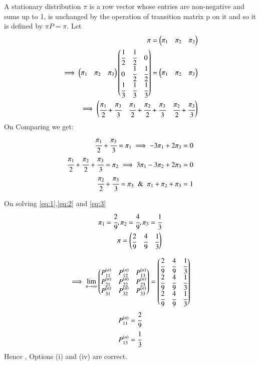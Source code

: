 \begin{enumerate}
A stationary distribution $\pi$ is a row vector whose entries are non-negative and sums up to 1, is unchanged by the operation of transition matrix p on it and so it is defined by $\pi P = \pi$.
Let
\begin{align}
    \pi=\begin{pmatrix}\pi_{1}&\pi_{2}&\pi_{3}\end{pmatrix}
\\
    \implies \begin{pmatrix}\pi_{1}&\pi_{2}&\pi_{3}\end{pmatrix}\begin{pmatrix}\cfrac{1}{2}&\cfrac{1}{2}&0\\0&\cfrac{1}{2}&\cfrac{1}{2}\\\cfrac{1}{3}&\cfrac{1}{3}&\cfrac{1}{3}\end{pmatrix} = \begin{pmatrix}\pi_{1}&\pi_{2}&\pi_{3}\end{pmatrix}
\\
    \implies \begin{pmatrix} \cfrac{\pi_{1}}{2}+\cfrac{\pi_{3}}{3}& \cfrac{\pi_{1}}{2}+\cfrac{\pi_{2}}{2}+\cfrac{\pi_{3}}{3}&\cfrac{\pi_{2}}{2}+\cfrac{\pi_{3}}{3}\end{pmatrix}
\end{align}
On Comparing we get:
\begin{align}
    \cfrac{\pi_{1}}{2}+\cfrac{\pi_{3}}{3}=\pi_{1} \implies -3\pi_{1}+2\pi_{3}=0 \label{eq:1}
\\
    \cfrac{\pi_{1}}{2}+\cfrac{\pi_{2}}{2}+\cfrac{\pi_{3}}{3}=\pi_{2} \implies 3\pi_{1}-3\pi_{2}+2\pi_{3}=0 \label{eq:2}
\\
    \cfrac{\pi_{2}}{2}+\cfrac{\pi_{3}}{3}=\pi_{3} \And \pi_{1}+\pi_{2}+\pi_{3}=1 \label{eq:3}
\end{align}

On solving \ref{eq:1},\ref{eq:2} and \ref{eq:3}
\begin{align}
    \pi_{1}=\cfrac{2}{9},\pi_{2}=\cfrac{4}{9},\pi_{3}=\cfrac{1}{3}
\\
    \pi = \begin{pmatrix}\cfrac{2}{9}&\cfrac{4}{9}&\cfrac{1}{3}\end{pmatrix}
\end{align}

\begin{align}
    \implies \lim_{n\to\infty}\begin{pmatrix}P_{11}^{(n)}&P_{12}^{(n)}&P_{13}^{(n)}\\P_{21}^{(n)}&P_{22}^{(n)}&P_{23}^{(n)}\\P_{31}^{(n)}&P_{32}^{(n)}&P_{33}^{(n)}\end{pmatrix} = \begin{pmatrix}\cfrac{2}{9}&\cfrac{4}{9}&\cfrac{1}{3}\\\cfrac{2}{9}&\cfrac{4}{9}&\cfrac{1}{3}\\\cfrac{2}{9}&\cfrac{4}{9}&\cfrac{1}{3} \end{pmatrix}
\end{align}
\begin{align}
    P_{11}^{(n)}=\cfrac{2}{9}
\\
    P_{13}^{(n)}=\cfrac{1}{3}
\end{align}
Hence , Options (i) and (iv) are correct.

\end{enumerate}




